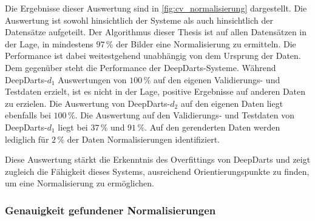Die Ergebnisse dieser Auswertung sind in \autoref{fig:cv_normalisierung} dargestellt. Die Auswertung ist sowohl hinsichtlich der Systeme als auch hinsichtlich der Datensätze aufgeteilt. Der Algorithmus dieser Thesis ist auf allen Datensätzen in der Lage, in mindestens $97\,\%$ der Bilder eine Normalisierung zu ermitteln. Die Performance ist dabei weitestgehend unabhängig von dem Ursprung der Daten. Dem gegenüber steht die Performance der DeepDarts-Systeme. Während DeepDarts-$d_1$ Auswertungen von $100\,\%$ auf den eigenen Validierungs- und Testdaten erzielt, ist es nicht in der Lage, positive Ergebnisse auf anderen Daten zu erzielen. Die Auswertung von DeepDarts-$d_2$ auf den eigenen Daten liegt ebenfalls bei $100\,\%$. Die Auswertung auf den Validierungs- und Testdaten von DeepDarts-$d_1$ liegt bei $37\,\%$ und $91\,\%$. Auf den gerenderten Daten werden lediglich für $2\,\%$ der Daten Normalisierungen identifiziert.

Diese Auswertung stärkt die Erkenntnis des Overfittings von DeepDarts und zeigt zugleich die Fähigkeit dieses Systems, ausreichend Orientierungspunkte zu finden, um eine Normalisierung zu ermöglichen.

\subsubsection{Genauigkeit gefundener Normalisierungen} %
\label{sec:genauigkeit_normalisierung}

\Similarities

